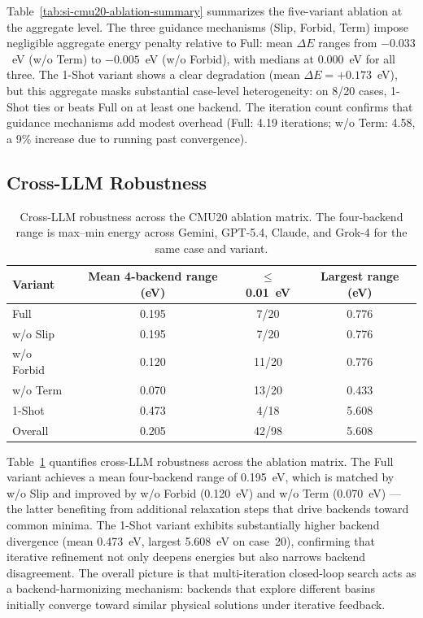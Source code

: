 \documentclass[%
 preprint,
 superscriptaddress,
 amsmath,amssymb,
 aps,
 prb,
 floatfix,
]{revtex4-2}
\begin{document}
Table~\ref{tab:si-cmu20-ablation-summary} summarizes the five-variant ablation at the aggregate level. The three guidance mechanisms (Slip, Forbid, Term) impose negligible aggregate energy penalty relative to Full: mean $\Delta E$ ranges from $-0.033$~eV (w/o Term) to $-0.005$~eV (w/o Forbid), with medians at 0.000~eV for all three. The 1-Shot variant shows a clear degradation (mean $\Delta E = +0.173$~eV), but this aggregate masks substantial case-level heterogeneity: on 8/20 cases, 1-Shot ties or beats Full on at least one backend. The iteration count confirms that guidance mechanisms add modest overhead (Full: 4.19 iterations; w/o Term: 4.58, a 9\% increase due to running past convergence).

\subsection{Cross-LLM Robustness}

\begin{table}[ht]
\centering
\caption{Cross-LLM robustness across the CMU20 ablation matrix. The four-backend range is max--min energy across Gemini, GPT-5.4, Claude, and Grok-4 for the same case and variant.}
\label{tab:si-cmu20-cross-llm}
\begin{tabular}{lccc}
\toprule
Variant & Mean 4-backend range (eV) & $\leq$0.01~eV & Largest range (eV) \\
\midrule
Full      & 0.195 &  7/20 & 0.776 \\
w/o Slip  & 0.195 &  7/20 & 0.776 \\
w/o Forbid & 0.120 & 11/20 & 0.776 \\
w/o Term   & 0.070 & 13/20 & 0.433 \\
1-Shot    & 0.473 &  4/18 & 5.608 \\
\midrule
Overall   & 0.205 & 42/98 & 5.608 \\
\bottomrule
\end{tabular}
\end{table}

Table~\ref{tab:si-cmu20-cross-llm} quantifies cross-LLM robustness across the ablation matrix. The Full variant achieves a mean four-backend range of 0.195~eV, which is matched by w/o Slip and improved by w/o Forbid (0.120~eV) and w/o Term (0.070~eV) — the latter benefiting from additional relaxation steps that drive backends toward common minima. The 1-Shot variant exhibits substantially higher backend divergence (mean 0.473~eV, largest 5.608~eV on case~20), confirming that iterative refinement not only deepens energies but also narrows backend disagreement. The overall picture is that multi-iteration closed-loop search acts as a backend-harmonizing mechanism: backends that explore different basins initially converge toward similar physical solutions under iterative feedback.
\end{document}

